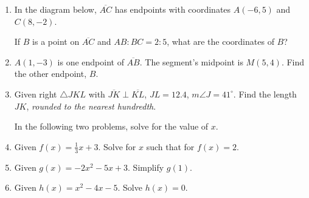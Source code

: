 \documentclass[12pt, twoside]{article}
\begin{document}
\begin{enumerate}
  \item In the diagram below, $\overline{AC}$ has endpoints with coordinates $A(-6,5)$ and $C(8, -2)$.
    \begin{center} %
    \end{center}
    If $B$ is a point on $\overline{AC}$ and $AB {:} BC = 2{:}5$,  what  are  the coordinates of $B$? \vspace{4cm}


  \item $A(1,-3)$ is one endpoint of $\overline{AB}$. The segment's midpoint is $M(5,4)$. Find the other endpoint, $B$. \vspace{3cm}


  \newpage

  \item Given right $\triangle JKL$ with $\overline{JK} \perp \overline{KL}$, $JL=12.4$, $m\angle J=41^\circ$. Find the length $JK$, \emph{rounded to the nearest hundredth}.
    \begin{center}
    \end{center}
\vspace{1cm}

  In the following two problems, solve for the value of $x$.

\vspace{3cm}

  \item Given $f(x)=\frac{1}{3} x+3$. Solve for $x$ such that for $f(x)=2$. \vspace{3.5cm}
  \item Given $g(x)=-2x^2-5x+3$. Simplify $g(1)$. \vspace{2cm}
  \item Given $h(x)=x^2-4x-5$. Solve $h(x)=0$. \vspace{3cm}


\end{enumerate}
\end{document}
